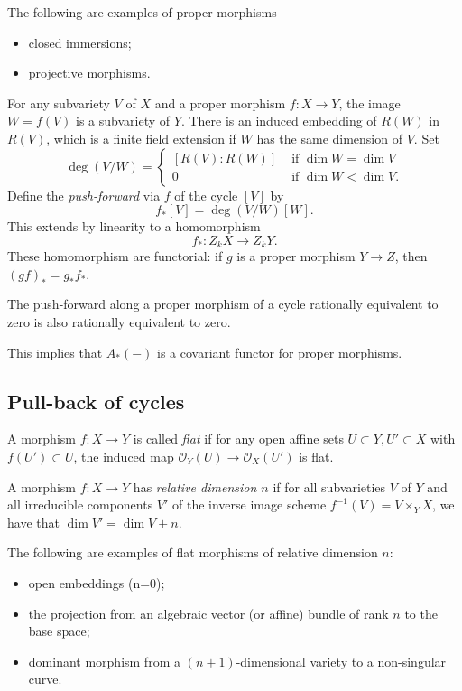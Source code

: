 \documentclass[a4paper,openany]{scrbook}
\begin{document}
\begin{example}
The following are examples of proper morphisms 
 \begin{itemize}
  \item closed immersions;
  \item projective morphisms.
 \end{itemize}
\end{example}

For any subvariety $V$ of $X$ and a proper morphism $f\colon X\to Y$, the image $W=f(V)$ is a subvariety of $Y$. There is an induced embedding of $R(W)$ in $R(V)$, which is a finite field extension if $W$ has the same dimension of $V$. Set
\[
\deg(V/W)=
\begin{cases}
[R(V):R(W)] &\text{ if } \dim W =\dim V\\
0  &\text{ if } \dim W <\dim V.
\end{cases}
\]
Define the \emph{push-forward} via $f$ of the cycle $[V]$ by
\[
f_*[V]=\deg(V/W)[W].
\]
This extends by linearity to a homomorphism
\[
f_*:Z_kX\to Z_kY.
\]
These homomorphism are functorial: if $g$ is a proper morphism $Y\to Z$, then $(gf)_*=g_*f_*$.
\begin{thm}
 The push-forward along a proper morphism of a cycle rationally equivalent to zero is also rationally equivalent to zero.
\end{thm}

This implies that $A_*(-)$ is a covariant functor for proper morphisms.

\subsection{Pull-back of cycles}

A morphism $f\colon X\to Y$ is called \emph{flat} if for any open affine sets $U\subset Y, U'\subset X$ with $f(U')\subset U$, the induced map $\mathcal O_Y(U)\to \mathcal O_X(U')$ is flat.

A morphism $f\colon X\to Y$ has \emph{relative dimension $n$} if for all subvarieties $V$ of $Y$ and all irreducible components $V'$ of the inverse image scheme $f^{-1}(V) = V \times_Y X$, we have that $\dim V' = \dim V +n$.

\begin{example}
 The following are examples of flat morphisms of relative dimension $n$:
 \begin{itemize}
  \item open embeddings (n=0);
  \item the projection from an algebraic vector (or affine) bundle of rank $n$ to the base space;
  \item dominant morphism from a $(n+1)$-dimensional variety to a non-singular curve.
 \end{itemize}
\end{example}
\end{document}
